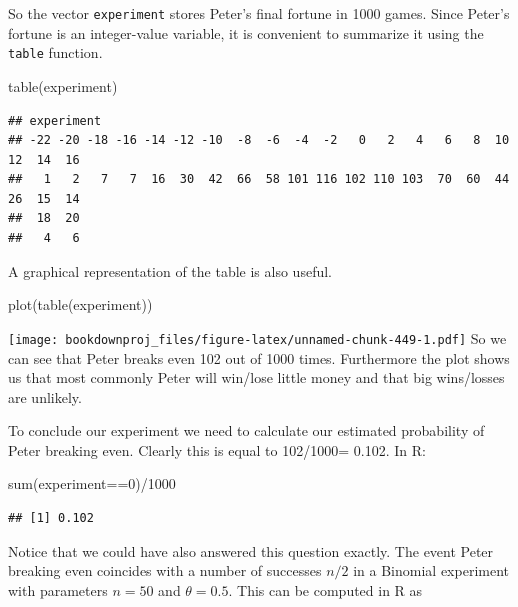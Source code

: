 \documentclass[
]{book}
\newenvironment{Shaded}{\begin{snugshade}}{\end{snugshade}}
\newcommand{\DecValTok}[1]{\textcolor[rgb]{0.00,0.00,0.81}{#1}}
\newcommand{\FunctionTok}[1]{\textcolor[rgb]{0.00,0.00,0.00}{#1}}
\newcommand{\NormalTok}[1]{#1}
\newcommand{\SpecialCharTok}[1]{\textcolor[rgb]{0.00,0.00,0.00}{#1}}
\begin{document}
So the vector \texttt{experiment} stores Peter's final fortune in 1000 games. Since Peter's fortune is an integer-value variable, it is convenient to summarize it using the \texttt{table} function.

\begin{Shaded}
\begin{Highlighting}[]
\FunctionTok{table}\NormalTok{(experiment)}
\end{Highlighting}
\end{Shaded}

\begin{verbatim}
## experiment
## -22 -20 -18 -16 -14 -12 -10  -8  -6  -4  -2   0   2   4   6   8  10  12  14  16 
##   1   2   7   7  16  30  42  66  58 101 116 102 110 103  70  60  44  26  15  14 
##  18  20 
##   4   6
\end{verbatim}

A graphical representation of the table is also useful.

\begin{Shaded}
\begin{Highlighting}[]
\FunctionTok{plot}\NormalTok{(}\FunctionTok{table}\NormalTok{(experiment))}
\end{Highlighting}
\end{Shaded}

\texttt{[image: bookdownproj\_files/figure-latex/unnamed-chunk-449-1.pdf]}
So we can see that Peter breaks even 102 out of 1000 times. Furthermore the plot shows us that most commonly Peter will win/lose little money and that big wins/losses are unlikely.

To conclude our experiment we need to calculate our estimated probability of Peter breaking even. Clearly this is equal to 102/1000= 0.102. In R:

\begin{Shaded}
\begin{Highlighting}[]
\FunctionTok{sum}\NormalTok{(experiment}\SpecialCharTok{==}\DecValTok{0}\NormalTok{)}\SpecialCharTok{/}\DecValTok{1000}
\end{Highlighting}
\end{Shaded}

\begin{verbatim}
## [1] 0.102
\end{verbatim}

Notice that we could have also answered this question exactly. The event Peter breaking even coincides with a number of successes \(n/2\) in a Binomial experiment with parameters \(n=50\) and \(\theta = 0.5\). This can be computed in R as
\end{document}
